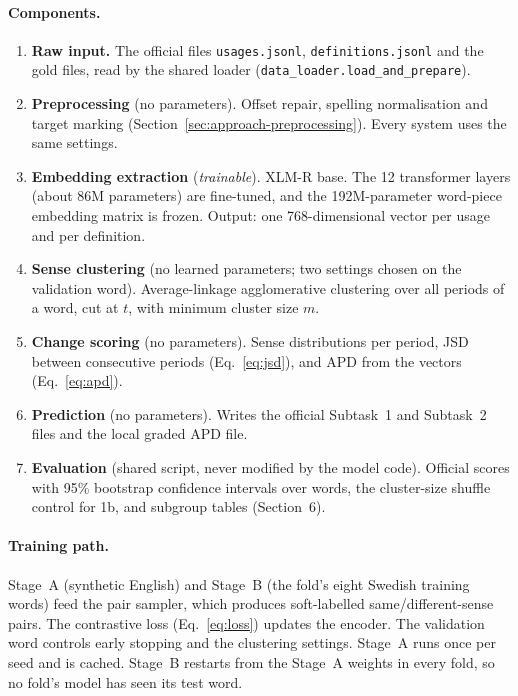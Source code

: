 \paragraph{Components.}
\begin{enumerate}
  \item \textbf{Raw input.} The official files \texttt{usages.jsonl},
        \texttt{definitions.jsonl} and the gold files, read by the shared loader
        (\texttt{data\_loader.load\_and\_prepare}).
  \item \textbf{Preprocessing} (no parameters). Offset repair, spelling
        normalisation and target marking (Section~\ref{sec:approach-preprocessing}).
        Every system uses the same settings.
  \item \textbf{Embedding extraction} (\emph{trainable}). XLM-R base. The 12
        transformer layers (about 86M parameters) are fine-tuned, and the
        192M-parameter word-piece embedding matrix is frozen. Output: one
        768-dimensional vector per usage and per definition.
  \item \textbf{Sense clustering} (no learned parameters; two settings chosen on
        the validation word). Average-linkage agglomerative clustering over all
        periods of a word, cut at $t$, with minimum cluster size $m$.
  \item \textbf{Change scoring} (no parameters). Sense distributions per period,
        JSD between consecutive periods (Eq.~\ref{eq:jsd}), and APD from the
        vectors (Eq.~\ref{eq:apd}).
  \item \textbf{Prediction} (no parameters). Writes the official Subtask~1 and
        Subtask~2 files and the local graded APD file.
  \item \textbf{Evaluation} (shared script, never modified by the model code).
        Official scores with 95\% bootstrap confidence intervals over words, the
        cluster-size shuffle control for 1b, and subgroup tables (Section~6).
\end{enumerate}

\paragraph{Training path.} Stage~A (synthetic English) and Stage~B (the fold's
eight Swedish training words) feed the pair sampler, which produces soft-labelled
same/different-sense pairs. The contrastive loss (Eq.~\ref{eq:loss}) updates the
encoder. The validation word controls early stopping and the clustering
settings. Stage~A runs once per seed and is cached. Stage~B restarts from the
Stage~A weights in every fold, so no fold's model has seen its test word.

